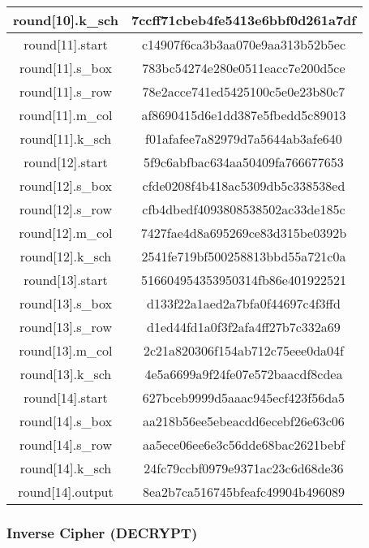 \begin{center}
\begin{longtable}{|c|c|}
\hline
round[10].k\_sch&   7ccff71cbeb4fe5413e6bbf0d261a7df\\
\hline
round[11].start&    c14907f6ca3b3aa070e9aa313b52b5ec\\
\hline
round[11].s\_box&   783bc54274e280e0511eacc7e200d5ce\\
\hline
round[11].s\_row&   78e2acce741ed5425100c5e0e23b80c7\\
\hline
round[11].m\_col&   af8690415d6e1dd387e5fbedd5c89013\\
\hline
round[11].k\_sch&   f01afafee7a82979d7a5644ab3afe640\\
\hline
round[12].start&    5f9c6abfbac634aa50409fa766677653\\
\hline
round[12].s\_box&   cfde0208f4b418ac5309db5c338538ed\\
\hline
round[12].s\_row&   cfb4dbedf4093808538502ac33de185c\\
\hline
round[12].m\_col&   7427fae4d8a695269ce83d315be0392b\\
\hline
round[12].k\_sch&   2541fe719bf500258813bbd55a721c0a\\
\hline
round[13].start&    516604954353950314fb86e401922521\\
\hline
round[13].s\_box&   d133f22a1aed2a7bfa0f44697c4f3ffd\\
\hline
round[13].s\_row&   d1ed44fd1a0f3f2afa4ff27b7c332a69\\
\hline
round[13].m\_col&   2c21a820306f154ab712c75eee0da04f\\
\hline
round[13].k\_sch&   4e5a6699a9f24fe07e572baacdf8cdea\\
\hline
round[14].start&    627bceb9999d5aaac945ecf423f56da5\\
\hline
round[14].s\_box&   aa218b56ee5ebeacdd6ecebf26e63c06\\
\hline
round[14].s\_row&   aa5ece06ee6e3c56dde68bac2621bebf\\
\hline
round[14].k\_sch&   24fc79ccbf0979e9371ac23c6d68de36\\
\hline
round[14].output&   8ea2b7ca516745bfeafc49904b496089\\
\hline
\end{longtable}
\end{center}

\subsubsection{Inverse Cipher (DECRYPT)}


